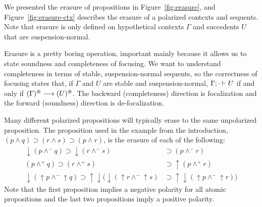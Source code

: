 \documentclass[acmtocl]{robtrans}\pdfoutput=1
\newcommand{\seq}[2]{{#1} \longrightarrow {#2} \mathstrut}
\newcommand{\ifoc}[3]{{#1}; {#2} \vdash {#3} \mathstrut}
\begin{document}
We presented the erasure of propositions in Figure~\ref{fig:erasure},
and Figure~\ref{fig:erasure-ctx} describes the erasure of a polarized
contexts and sequents. Note that erasure is only defined on
hypothetical contexts $\Gamma$ and succedents $U$ that are
suspension-normal.
 
Erasure is a pretty boring operation, important mainly because it
allows us to state soundness and completeness of focusing. We want to
understand completeness in terms of stable, suspension-normal
sequents, so the correctness of focusing states that, if $\Gamma$
and $U$ are stable and suspension-normal, $\ifoc{\Gamma}{\cdot}{U}$ if
and only if $\seq{(\Gamma)^\circledast}{(U)^\circledast}$. The
backward (completeness) direction is focalization and the forward
(soundness) direction is de-focalization.

Many different polarized propositions will typically erase to the same
unpolarized proposition.  The proposition used in the example from the
introduction, $(p \wedge q) \supset (r \wedge s) \supset (p \wedge
r)$, is the erasure of each of the following:
\begin{align}
{\downarrow}(p \wedge^- q) \supset
 {\downarrow}(r \wedge^- s) & \supset 
 (p \wedge^- r)\label{eqn:neg}\\
(p \wedge^+ q) \supset 
 (r \wedge^+ s) & \supset
 {\uparrow}(p \wedge^+ r)\label{eqn:pos}\\
{\downarrow}({\uparrow}p \wedge^- {\uparrow}q) \supset
 {\uparrow}{\downarrow}({\downarrow}({\uparrow}r \wedge^- {\uparrow}s) & \supset
 {\uparrow}{\downarrow}({\uparrow}p \wedge^- {\uparrow}r))\label{eqn:seq}
\end{align}
Note that the first proposition implies a 
negative polarity for all atomic propositions and the last two propositions
imply a positive polarity. 
\end{document}

